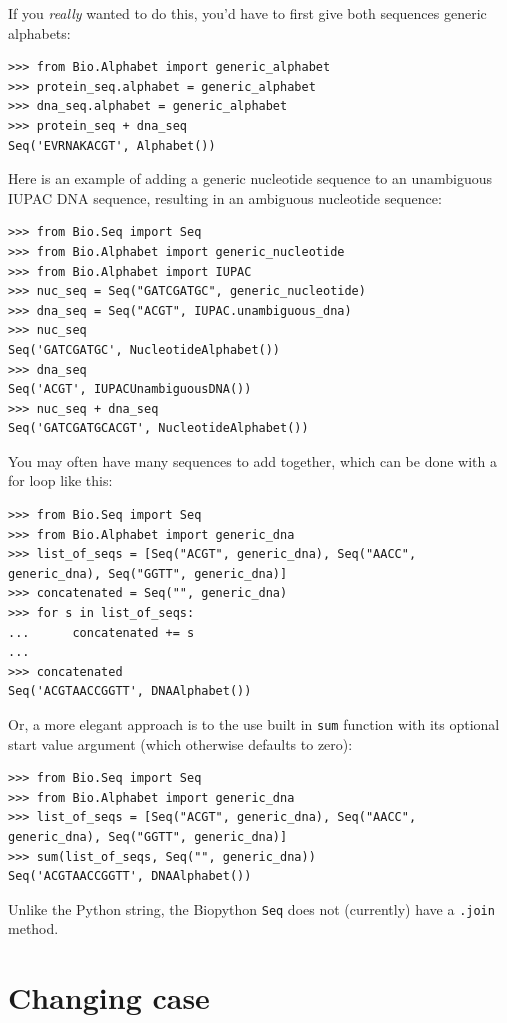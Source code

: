 \documentclass{report}
\begin{document}
If you \emph{really} wanted to do this, you'd have to first give both sequences generic alphabets:

\begin{verbatim}
>>> from Bio.Alphabet import generic_alphabet
>>> protein_seq.alphabet = generic_alphabet
>>> dna_seq.alphabet = generic_alphabet
>>> protein_seq + dna_seq
Seq('EVRNAKACGT', Alphabet())
\end{verbatim}

Here is an example of adding a generic nucleotide sequence to an unambiguous IUPAC DNA sequence, resulting in an ambiguous nucleotide sequence:

\begin{verbatim}
>>> from Bio.Seq import Seq
>>> from Bio.Alphabet import generic_nucleotide
>>> from Bio.Alphabet import IUPAC
>>> nuc_seq = Seq("GATCGATGC", generic_nucleotide)
>>> dna_seq = Seq("ACGT", IUPAC.unambiguous_dna)
>>> nuc_seq
Seq('GATCGATGC', NucleotideAlphabet())
>>> dna_seq
Seq('ACGT', IUPACUnambiguousDNA())
>>> nuc_seq + dna_seq
Seq('GATCGATGCACGT', NucleotideAlphabet())
\end{verbatim}

You may often have many sequences to add together, which can be done with a for loop like this:

\begin{verbatim}
>>> from Bio.Seq import Seq
>>> from Bio.Alphabet import generic_dna
>>> list_of_seqs = [Seq("ACGT", generic_dna), Seq("AACC", generic_dna), Seq("GGTT", generic_dna)]
>>> concatenated = Seq("", generic_dna)
>>> for s in list_of_seqs:
...      concatenated += s
...
>>> concatenated
Seq('ACGTAACCGGTT', DNAAlphabet())
\end{verbatim}

Or, a more elegant approach is to the use built in \verb|sum| function with its optional start value argument (which otherwise defaults to zero):

\begin{verbatim}
>>> from Bio.Seq import Seq
>>> from Bio.Alphabet import generic_dna
>>> list_of_seqs = [Seq("ACGT", generic_dna), Seq("AACC", generic_dna), Seq("GGTT", generic_dna)]
>>> sum(list_of_seqs, Seq("", generic_dna))
Seq('ACGTAACCGGTT', DNAAlphabet())
\end{verbatim}

Unlike the Python string, the Biopython \verb|Seq| does not (currently) have a \verb|.join| method.

\section{Changing case}
\end{document}
